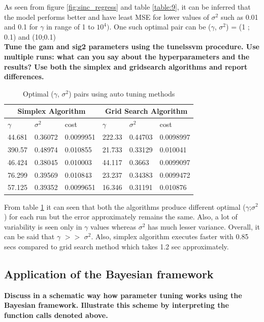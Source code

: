 As seen from figure \ref{fig:sinc_regress} and table \ref{table:9}, it can be inferred that the model performs better and have least MSE for lower values of $\sigma^2$ such as 0.01 and 0.1 for $\gamma$ in range of 1 to $10^4)$.  One such optimal pair can be  ($\gamma$, $\sigma^2$) = (1 ; 0.1) and (10;0.1)\\
\newline
\textbf{Tune the gam and sig2 parameters using the tunelssvm procedure. Use multiple runs:
	what can you say about the hyperparameters and the results? Use both the simplex
	and gridsearch algorithms and report differences.}

\begin{table}
	\centering
	\begin{tabular}{ |p{1.5cm}|p{1.5cm}|p{1.7cm}||p{1.5cm}|p{1.5cm}|p{1.7cm}| }
		\hline
		\multicolumn{3}{|c||}{Simplex Algorithm} &\multicolumn{3}{c|}{Grid Search Algorithm}
		\\ \hline	
		\cellcolor{blue!25}$\gamma$ &\cellcolor{blue!25}$\sigma^2$ & \cellcolor{blue!25}cost & \cellcolor{blue!25}$\gamma$ &\cellcolor{blue!25}$\sigma^2$ &\cellcolor{blue!25}cost \\ \hline
		44.681 &0.36072 &0.0099951 &222.33 &0.44703 &0.0098997 \\ \hline
		390.57 &0.48974 &0.010855 &21.733  &0.33129 &0.010041 \\ \hline
		46.424 &0.38045 &0.010003 &44.117  &0.3663   &0.0099097 \\ \hline
		76.299 & 0.39569 &0.010843 &23.237  &0.34383  &0.0099472 \\ \hline
		57.125 &0.39352 &0.0099651 &16.346 &0.31191 &0.010876 \\ \hline
		
	\end{tabular}
	\caption{Optimal ($\gamma$, $\sigma^2$) pairs using auto tuning methods}
	\label{table:10}
\end{table}
From table \ref{table:10} it can seen that both the algorithms produce different optimal ($\gamma$;$\sigma^2$) for each run but the error approximately remains the same. Also, a lot of variability is seen only in $\gamma$ values whereas $\sigma^2$ has much lesser variance. Overall, it can be said that $\gamma$ $>>$ $\sigma^2$. Also, simplex algorithm executes faster with 0.85 secs compared to grid search method which takes 1.2 sec approximately. 
\subsection{Application of the Bayesian framework}
\textbf{Discuss in a schematic way how parameter tuning works using the Bayesian framework.
	Illustrate this scheme by interpreting the function calls denoted above.}

